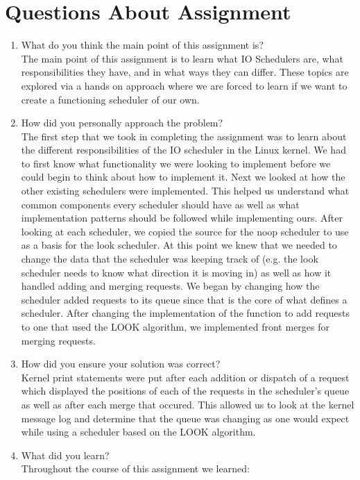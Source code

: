 \documentclass[onecolumn,draftclsnofoot, 10pt, compsoc]{IEEEtran}
\begin{document}
\section{Questions About Assignment}
	\begin{enumerate}
		\item What do you think the main point of this assignment is? \\
			The main point of this assignment is to learn what IO Schedulers are, what responsibilities they have, and in what ways they can differ.
			These topics are explored via a hands on approach where we are forced to learn if we want to create a functioning scheduler of our own.
		\item How did you personally approach the problem? \\
			The first step that we took in completing the assignment was to learn about the different responsibilities of the IO scheduler in the Linux kernel.
			We had to first know what functionality we were looking to implement before we could begin to think about how to implement it.
			Next we looked at how the other existing schedulers were implemented.
			This helped us understand what common components every scheduler should have as well as what implementation patterns should be followed while implementing ours.
			After looking at each scheduler, we copied the source for the noop scheduler to use as a basis for the look scheduler. 
			At this point we knew that we needed to change the data that the scheduler was keeping track of (e.g. the look scheduler needs to know what direction it is moving in) as well as how it handled adding and merging requests.
			We began by changing how the scheduler added requests to its queue since that is the core of what defines a scheduler.
			After changing the implementation of the function to add requests to one that used the LOOK algorithm, we implemented front merges for merging requests.
		\item How did you ensure your solution was correct? \\
			Kernel print statements were put after each addition or dispatch of a request which displayed the positions of each of the requests in the scheduler's queue as well as after each merge that occured.
			This allowed us to look at the kernel message log and determine that the queue was changing as one would expect while using a scheduler based on the LOOK algorithm.
		\item What did you learn? \\
			Throughout the course of this assignment we learned:

\end{enumerate}
\end{document}
